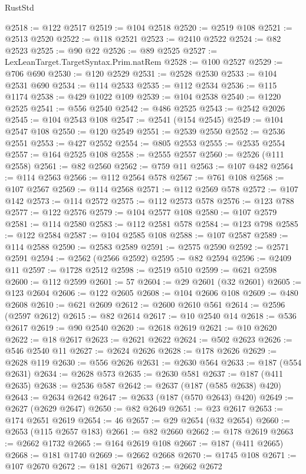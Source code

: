 \begin{lexlean}{RustStd}
\begin{coremodule}
@2518 := @122 @2517
@2519 := @104 @2518
@2520 := @2519 @108
@2521 := @2513 @2520
@2522 := @118 @2521
@2523 := @2410 @2522
@2524 := @82 @2523
@2525 := @90 @22
@2526 := @89 @2525
@2527 := LexLeanTarget.TargetSyntax.Prim.natRem
@2528 := @100 @2527
@2529 := @706 @690
@2530 := @120 @2529
@2531 := @2528 @2530
@2533 := @104 @2531 @690
@2534 := @114 @2533
@2535 := @112 @2534
@2536 := @115 @1174
@2538 := @429 @1022 @109
@2539 := @104 @2538
@2540 := @1220 @2525
@2541 := @556 @2540
@2542 := @486 @2525
@2543 := @2542 @2026
@2545 := @104 @2543 @108
@2547 := @2541 (@154 @2545)
@2549 := @104 @2547 @108
@2550 := @120 @2549
@2551 := @2539 @2550
@2552 := @2536 @2551
@2553 := @427 @2552
@2554 := @805 @2553
@2555 := @2535 @2554
@2557 := @164 @2525 @108
@2558 := @2555 @2557
@2560 := @2526 (@111 @2558)
@2561 := @82 @2560
@2562 := @759 @11
@2563 := @107 @482
@2564 := @114 @2563
@2566 := @112 @2564 @578
@2567 := @761 @108
@2568 := @107 @2567
@2569 := @114 @2568
@2571 := @112 @2569 @578
@2572 := @107 @142
@2573 := @114 @2572
@2575 := @112 @2573 @578
@2576 := @123 @788
@2577 := @122 @2576
@2579 := @104 @2577 @108
@2580 := @107 @2579
@2581 := @114 @2580
@2583 := @112 @2581 @578
@2584 := @123 @798
@2585 := @122 @2584
@2587 := @104 @2585 @108
@2588 := @107 @2587
@2589 := @114 @2588
@2590 := @2583 @2589
@2591 := @2575 @2590
@2592 := @2571 @2591
@2594 := @2562 (@2566 @2592)
@2595 := @82 @2594
@2596 := @2409 @11
@2597 := @1728 @2512
@2598 := @2519 @510
@2599 := @621 @2598
@2600 := @112 @2599
@2601 := 57
@2604 := @29 @2601 (@32 @2601)
@2605 := @123 @2604
@2606 := @122 @2605
@2608 := @104 @2606 @108
@2609 := @480 @2608
@2610 := @621 @2609
@2612 := @2600 @2610 @561
@2614 := @2596 (@2597 @2612)
@2615 := @82 @2614
@2617 := @10 @2540 @14
@2618 := @536 @2617
@2619 := @90 @2540
@2620 := @2618 @2619
@2621 := @10 @2620
@2622 := @18 @2617
@2623 := @2621 @2622
@2624 := @502 @2623
@2626 := @546 @2540 @11
@2627 := @2624 @2626
@2628 := @178 @2626
@2629 := @2628 @119
@2630 := @556 @2626
@2631 := @2630 @564
@2633 := @187 (@554 @2631)
@2634 := @2628 @573
@2635 := @2630 @581
@2637 := @187 (@411 @2635)
@2638 := @2536 @587
@2642 := @2637 (@187 (@585 @2638) @420)
@2643 := @2634 @2642
@2647 := @2633 (@187 (@570 @2643) @420)
@2649 := @2627 (@2629 @2647)
@2650 := @82 @2649
@2651 := @23 @2617
@2653 := @174 @2651 @2619
@2654 := 46
@2657 := @29 @2654 (@32 @2654)
@2660 := @2653 (@115 @2657 @183)
@2661 := @82 @2660
@2662 := @178 @2619
@2663 := @2662 @1732
@2665 := @164 @2619 @108
@2667 := @187 (@411 @2665)
@2668 := @181 @1740
@2669 := @2662 @2668
@2670 := @1745 @108
@2671 := @107 @2670
@2672 := @181 @2671
@2673 := @2662 @2672

\end{coremodule}
\end{lexlean}
